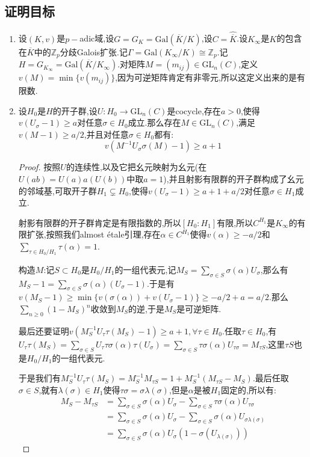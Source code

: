 \subsection{证明目标}
\begin{enumerate}
	\item 设$(K,v)$是$p-$adic域,设$G=G_K=\mathrm{Gal}(\overline{K}/K)$,设$C=\widehat{\overline{K}}$.设$K_{\infty}$是$K$的包含在$\overline{K}$中的$\mathbb{Z}_p$分歧Galois扩张.记$\Gamma=\mathrm{Gal}(K_{\infty}/K)\cong\mathbb{Z}_p$.记$H=G_{K_{\infty}}=\mathrm{Gal}(\overline{K}/K_{\infty})$.对矩阵$M=(m_{ij})\in\mathrm{GL}_n(C)$,定义$v(M)=\min\{v(m_{ij})\}$,因为可逆矩阵肯定有非零元,所以这定义出来的是有限数.
	\item 设$H_0$是$H$的开子群,设$U:H_0\to\mathrm{GL}_n(C)$是cocycle,存在$a>0$,使得$v(U_{\sigma}-1)\ge a$对任意$\sigma\in H_0$成立.那么存在$M\in\mathrm{GL}_n(C)$,满足$v(M-1)\ge a/2$,并且对任意$\sigma\in H_0$都有:$$v(M^{-1}U_{\sigma}\sigma(M)-1)\ge a+1$$
	\begin{proof}
		
		按照$U$的连续性,以及它把幺元映射为幺元(在$U(ab)=U(a)a(U(b))$中取$a=1$),并且射影有限群的开子群构成了幺元的邻域基,可取开子群$H_1\subsetneq H_0$,使得$v(U_{\sigma}-1)\ge a+1+a/2$对任意$\sigma\in H_1$成立.
		
		\qquad
		
		射影有限群的开子群肯定是有限指数的,所以$[H_0:H_1]$有限,所以$C^{H_1}$是$K_{\infty}$的有限扩张,按照我们almost \'etale引理,存在$\alpha\in C^{H_1}$使得$v(\alpha)\ge-a/2$和$\sum_{\tau\in H_0/H_1}\tau(\alpha)=1$.
		
		\qquad
		
		构造$M$:记$S\subset H_0$是$H_0/H_1$的一组代表元,记$M_S=\sum_{\sigma\in S}\sigma(\alpha)U_{\sigma}$,那么有$M_S-1=\sum_{\sigma\in S}\sigma(\alpha)(U_{\sigma}-1)$.于是有$v(M_S-1)\ge\min\{v(\sigma(\alpha))+v(U_{\sigma}-1)\}\ge-a/2+a=a/2$.那么$\sum_{n\ge0}(1-M_S)^n$收敛到$M_S$的逆,于是$M_S$是可逆矩阵.
		
		\qquad
		
		最后还要证明$v(M_S^{-1}U_{\tau}\tau(M_S)-1)\ge a+1,\forall\tau\in H_0$.任取$\tau\in H_0$,有$U_{\tau}\tau(M_S)=\sum_{\sigma\in S}U_{\tau}\tau\sigma(\alpha)\tau(U_{\sigma})=\sum_{\sigma\in S}\tau\sigma(\alpha)U_{\tau\sigma}=M_{\tau S}$,这里$\tau S$也是$H_0/H_1$的一组代表元.
		
		\qquad
		
		于是我们有$M_S^{-1}U_{\tau}\tau(M_S)=M_S^{-1}M_{\tau S}=1+M_S^{-1}(M_{\tau S}-M_S)$.最后任取$\sigma\in S$,就有$\lambda(\sigma)\in H_1$使得$\tau\sigma=\sigma\lambda(\sigma)$,但是$\alpha$是被$H_1$固定的,所以有:
		\begin{align*}
			M_S-M_{\tau S}&=\sum_{\sigma\in S}\sigma(\alpha)U_{\sigma}-\sum_{\sigma\in S}\tau\sigma(\alpha)U_{\tau\sigma}\\&=\sum_{\sigma\in S}\sigma(\alpha)U_{\sigma}-\sum_{\sigma\in S}\sigma(\alpha)U_{\sigma\lambda(\sigma)}\\&=\sum_{\sigma\in S}\sigma(\alpha)U_{\sigma}(1-\sigma(U_{\lambda(\sigma)}))
		\end{align*}
		

\end{proof}
\end{enumerate}
